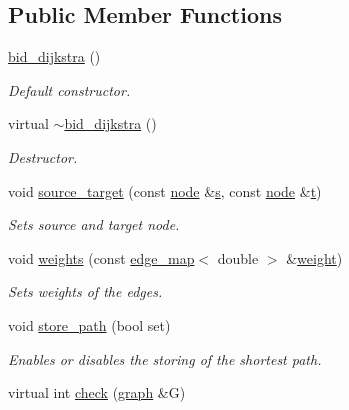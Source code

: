 \subsection*{Public Member Functions}
\begin{DoxyCompactItemize}
\item 
\mbox{\hyperlink{classbid__dijkstra_a1f9ddd95b88b24f45afe0966c2ae181b}{bid\+\_\+dijkstra}} ()
\begin{DoxyCompactList}\small\item\em Default constructor. \end{DoxyCompactList}\item 
virtual \mbox{\hyperlink{classbid__dijkstra_a3d46b327a3a87ac874e3930227a13757}{$\sim$bid\+\_\+dijkstra}} ()
\begin{DoxyCompactList}\small\item\em Destructor. \end{DoxyCompactList}\item 
void \mbox{\hyperlink{classbid__dijkstra_a25dfbd432043e2e642e4dc71f4cb3208}{source\+\_\+target}} (const \mbox{\hyperlink{classnode}{node}} \&\mbox{\hyperlink{classbid__dijkstra_a118e2ebd0d08ffc991c2bc578f8284a4}{s}}, const \mbox{\hyperlink{classnode}{node}} \&\mbox{\hyperlink{classbid__dijkstra_a9370a71076d7807d1f3963e6dad9897e}{t}})
\begin{DoxyCompactList}\small\item\em Sets source and target node. \end{DoxyCompactList}\item 
void \mbox{\hyperlink{classbid__dijkstra_a33dd3a1cc5eb156b56a72235c9140e7d}{weights}} (const \mbox{\hyperlink{classedge__map}{edge\+\_\+map}}$<$ double $>$ \&\mbox{\hyperlink{classbid__dijkstra_a477c4f7ce631df84c832cb7d517cd243}{weight}})
\begin{DoxyCompactList}\small\item\em Sets weights of the edges. \end{DoxyCompactList}\item 
void \mbox{\hyperlink{classbid__dijkstra_a0032d9b44c8b3f6f5733ff3ef94cf169}{store\+\_\+path}} (bool set)
\begin{DoxyCompactList}\small\item\em Enables or disables the storing of the shortest path. \end{DoxyCompactList}\item 
virtual int \mbox{\hyperlink{classbid__dijkstra_a504aa04d114f27f2f886ee3b025ad95b}{check}} (\mbox{\hyperlink{classgraph}{graph}} \&G)

\end{DoxyCompactItemize}

